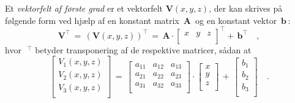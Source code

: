 \begin{definition} \label{defVFgrad1}
Et {\em{{vektorfelt  af første grad}}} er et
vektorfelt  ${\mathbf{V}}(x,y,z)$, der kan skrives på følgende form ved
hjælp af en konstant matrix ${\,\mathbf{A}\,}$ og en
konstant vektor $\,{\mathbf{b}}\,$:
\begin{equation} \label{eqVFmatrix}
{\mathbf{V}}^{\top} \, = \,  \left({\mathbf{V}}(x,y,z)\right)^{\top}\, = \,{\mathbf{A}}\cdot \left[
                                                                \begin{array}{ccc}
                                                                  x & y & z\\
                                                                \end{array}
                                                              \right]
^{\top} + \, {\mathbf{b}}^{\top} \quad ,
\end{equation}
hvor $\, \, ^{\top}$ betyder transponering af de respektive matricer, sådan at
\begin{equation}
\left[
  \begin{array}{c}
    V_{1}(x,y,z) \\
    V_{2}(x,y,z) \\
    V_{3}(x,y,z) \\
  \end{array}\right] \, = \, \left[
                        \begin{array}{ccc}
                          a_{11} & a_{12} & a_{13} \\
                          a_{21} & a_{22} & a_{23} \\
                          a_{31} & a_{32} & a_{33} \\
                        \end{array}\right]\cdot \left[
                                        \begin{array}{c}
                                          x \\
                                          y \\
                                          z \\
                                        \end{array}
                                      \right] \, + \, \left[
                                                        \begin{array}{c}
                                                          b_{1} \\
                                                          b_{2} \\
                                                          b_{3} \\
                                                        \end{array}
                                                      \right] \quad .
\end{equation}
\end{definition}



